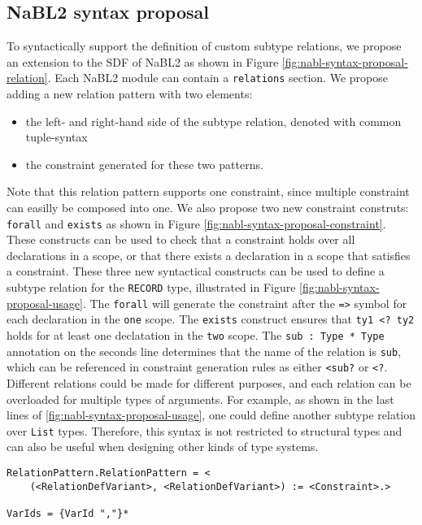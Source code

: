 \subsection{NaBL2 syntax proposal}
To syntactically support the definition of custom subtype relations, 
we propose an extension to the SDF of NaBL2 as shown in Figure \ref{fig:nabl-syntax-proposal-relation}.
Each NaBL2 module can contain a \texttt{relations} section.
We propose adding a new relation pattern with two elements: 
\begin{itemize}
\item the left- and right-hand side of the subtype relation, denoted with common tuple-syntax
\item the constraint generated for these two patterns.
\end{itemize}
Note that this relation pattern supports one constraint, 
since multiple constraint can easilly be composed into one.
We also propose two new constraint construts: \texttt{forall} and \texttt{exists} as shown in Figure \ref{fig:nabl-syntax-proposal-constraint}.
These constructs can be used to check that a constraint holds over all declarations in a scope, 
or that there exists a declaration in a scope that satisfies a constraint.
These three new syntactical constructs can be used to define a subtype relation for the \texttt{RECORD} type,
illustrated in Figure \ref{fig:nabl-syntax-proposal-usage}.
The \texttt{forall} will generate the constraint after the \texttt{=>} symbol for each declaration in the \texttt{one} scope.
The \texttt{exists} construct ensures that \texttt{ty1 <? ty2} holds for at least one declatation in the \texttt{two} scope.
The \texttt{sub : Type * Type} annotation on the seconds line determines that the name of the relation is \texttt{sub},
which can be referenced in constraint generation rules as either \texttt{<sub?} or \texttt{<?}.
Different relations could be made for different purposes, and each relation can be overloaded for multiple types of arguments.
For example, as shown in the last lines of \ref{fig:nabl-syntax-proposal-usage}, one could define another subtype relation over \texttt{List} types.
Therefore, this syntax is not restricted to structural types and can also be useful when designing other kinds of type systems.

\begin{figure*}
\begin{lstlisting}
RelationPattern.RelationPattern = <
	(<RelationDefVariant>, <RelationDefVariant>) := <Constraint>.>

VarIds = {VarId ","}*
\end{lstlisting}
\caption{The syntax proposal for NaBL2 relation definitions.}
\label{fig:nabl-syntax-proposal-relation}
\end{figure*}

